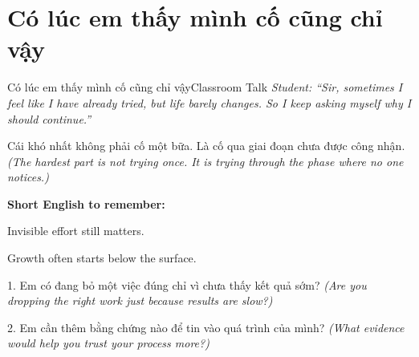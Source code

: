 \section{Có lúc em thấy mình cố cũng chỉ vậy}
\begin{truyen}{Có lúc em thấy mình cố cũng chỉ vậy}{Classroom Talk}
\textit{Student: ``Sir, sometimes I feel like I have already tried, but life barely changes. So I keep asking myself why I should continue.''}\\[4pt]



\end{truyen}

\begin{baihoc}
Cái khó nhất không phải cố một bữa. Là cố qua giai đoạn chưa được công nhận.
\textit{(The hardest part is not trying once. It is trying through the phase where no one notices.)}
\end{baihoc}

\begin{ghinhoanh}
\textbf{Short English to remember:}

Invisible effort still matters.

Growth often starts below the surface.
\end{ghinhoanh}

\begin{tuhocnhanh}
1. Em có đang bỏ một việc đúng chỉ vì chưa thấy kết quả sớm? \textit{(Are you dropping the right work just because results are slow?)}

2. Em cần thêm bằng chứng nào để tin vào quá trình của mình? \textit{(What evidence would help you trust your process more?)}
\end{tuhocnhanh}
\ngancach